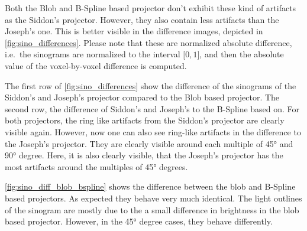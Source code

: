 Both the Blob and B-Spline based projector don't exhibit these kind of artifacts as the Siddon's
projector. However, they also contain less artifacts than the Joseph's one. This is better visible
in the difference images, depicted in \autoref{fig:sino_differences}. Please note that these are
normalized absolute difference, i.e.\ the sinograms are normalized to the interval \(\mathopen[0,
	1\mathclose]\), and then the absolute value of the voxel-by-voxel difference is computed.

The first row of \autoref{fig:sino_differences} show the difference of the sinograms of the Siddon's
and Joseph's projector compared to the Blob based projector. The second row, the difference of
Siddon's and Joseph's to the B-Spline based on. For both projectors, the ring like artifacts from
the Siddon's projector are clearly visible again. However, now one can also see ring-like artifacts
in the difference to the Joseph's projector. They are clearly visible around each multiple of 45°
and 90° degree. Here, it is also clearly visible, that the Joseph's projector has the most artifacts
around the multiples of 45° degrees.

\autoref{fig:sino_diff_blob_bspline} shows the difference between the blob and B-Spline based
projectors. As expected they behave very much identical. The light outlines of the sinogram are
mostly due to the a small difference in brightness in the blob based projector. However, in the 45°
degree cases, they behave differently. 

